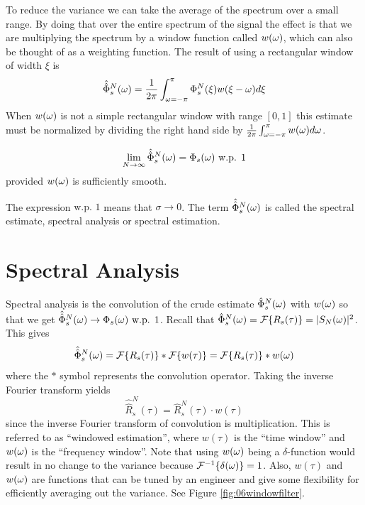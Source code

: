 To reduce the variance we can take the average of the spectrum over a small range. By doing that over the entire spectrum of the signal the effect is that we are multiplying the spectrum by a window function called $w(\omega)$, which can also be thought of as a weighting function. The result of using a rectangular window of width $\xi$ is
$$\hat{\hat{\Phi}}_s^N(\omega) = \frac{1}{2\pi}\int_{\omega=-\pi}^\pi \Phi_s^N(\xi)w(\xi-\omega)d\xi$$
When $w(\omega)$ is not a simple rectangular window with range $[0,1]$ this estimate must be normalized by dividing the right hand side by $\frac{1}{2\pi}\int_{\omega=-\pi}^\pi w(\omega)d\omega$.

\begin{theorem}
$$\lim_{N\to\infty}\hat{\hat{\Phi}}_s^N(\omega) = \Phi_s(\omega) \text{ w.p. } 1$$
provided $w(\omega)$ is sufficiently smooth.
\end{theorem}
The expression $\text{w.p. } 1$ means that $\sigma\to 0$. The term $\hat{\hat{\Phi}}_s^N(\omega)$ is called the spectral estimate, spectral analysis or spectral estimation.

\section{Spectral Analysis}
Spectral analysis is the convolution of the crude estimate $\hat{\Phi}_s^N(\omega)$ with $w(\omega)$ so that we get $\hat{\hat{\Phi}}_s^N(\omega) \to \Phi_s(\omega) \text{ w.p. } 1$. Recall that $\hat{\Phi}_s^N(\omega) = \mathcal{F}\{R_s(\tau)\} = |S_N(\omega)|^2$. This gives
$$\hat{\hat{\Phi}}_s^N(\omega) = \mathcal{F}\{R_s(\tau)\} * \mathcal{F}\{w(\tau)\} = \mathcal{F}\{R_s(\tau)\} * w(\omega)$$
where the $*$ symbol represents the convolution operator. Taking the inverse Fourier transform yields
$$\hat{\hat{R}}_s^N(\tau) = \hat{R}_s^N(\tau)\cdot w(\tau)$$
since the inverse Fourier transform of convolution is multiplication. This is referred to as ``windowed estimation'', where $w(\tau)$ is the ``time window'' and $w(\omega)$ is the ``frequency window''. Note that using $w(\omega)$ being a $\delta$-function would result in no change to the variance because $\mathcal{F}^{-1}\{\delta(\omega)\} = 1$. Also, $w(\tau)$ and $w(\omega)$ are functions that can be tuned by an engineer and give some flexibility for efficiently averaging out the variance. See Figure \ref{fig:06windowfilter}.

